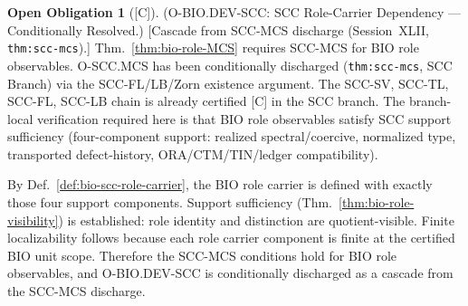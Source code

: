 \documentclass[12pt,oneside]{amsbook}
\theoremstyle{plain}
\theoremstyle{definition}
\newtheorem{obligation}[theorem]{Open Obligation}
\theoremstyle{remark}
\newcommand{\status}[1]{\textup{[#1]}}
\begin{document}
\begin{obligation}[\status{C}]\label{ob:bio-DEV-scc-dep}
\textup{(O-BIO.DEV-SCC: SCC Role-Carrier Dependency --- Conditionally Resolved.)}
\textup{[Cascade from SCC-MCS discharge (Session~XLII,
\texttt{thm:scc-mcs}).]}
Thm.~\ref{thm:bio-role-MCS} requires SCC-MCS for BIO role
observables. O-SCC.MCS has been conditionally discharged
(\texttt{thm:scc-mcs}, SCC Branch) via the SCC-FL/LB/Zorn
existence argument. The SCC-SV, SCC-TL, SCC-FL, SCC-LB
chain is already certified [C] in the SCC branch. The
branch-local verification required here is that BIO role
observables satisfy SCC support sufficiency (four-component
support: realized spectral/coercive, normalized type, transported
defect-history, ORA/CTM/TIN/ledger compatibility).

By Def.~\ref{def:bio-scc-role-carrier}, the BIO role carrier is
defined with exactly those four support components. Support
sufficiency (Thm.~\ref{thm:bio-role-visibility}) is established:
role identity and distinction are quotient-visible.
Finite localizability follows because each role carrier component
is finite at the certified BIO unit scope. Therefore the
SCC-MCS conditions hold for BIO role observables, and
O-BIO.DEV-SCC is conditionally discharged as a cascade from the
SCC-MCS discharge.
\end{obligation}
\end{document}
